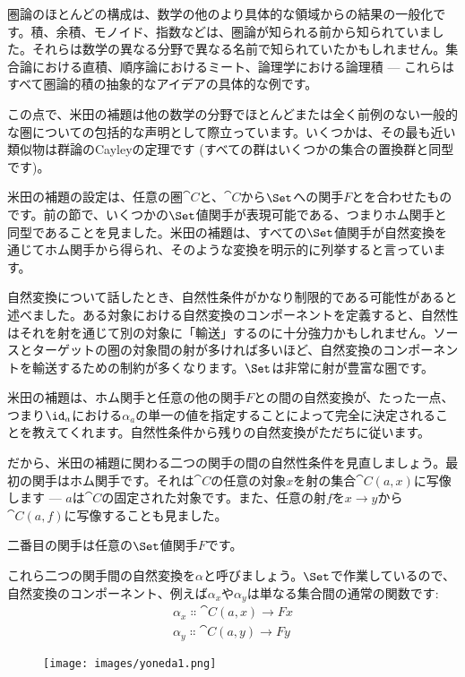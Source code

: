 
\lettrine[lhang=0.17]{圏}{論}のほとんどの構成は、数学の他のより具体的な領域からの結果の一般化です。積、余積、モノイド、指数などは、圏論が知られる前から知られていました。それらは数学の異なる分野で異なる名前で知られていたかもしれません。集合論における直積、順序論におけるミート、論理学における論理積 — これらはすべて圏論的積の抽象的なアイデアの具体的な例です。

この点で、米田の補題は他の数学の分野でほとんどまたは全く前例のない一般的な圏についての包括的な声明として際立っています。いくつかは、その最も近い類似物は群論のCayleyの定理です (すべての群はいくつかの集合の置換群と同型です)。

米田の補題の設定は、任意の圏$\cat{C}$と、$\cat{C}$から$\Set$への関手$F$とを合わせたものです。前の節で、いくつかの$\Set$値関手が表現可能である、つまりホム関手と同型であることを見ました。米田の補題は、すべての$\Set$値関手が自然変換を通じてホム関手から得られ、そのような変換を明示的に列挙すると言っています。

自然変換について話したとき、自然性条件がかなり制限的である可能性があると述べました。ある対象における自然変換のコンポーネントを定義すると、自然性はそれを射を通じて別の対象に「輸送」するのに十分強力かもしれません。ソースとターゲットの圏の対象間の射が多ければ多いほど、自然変換のコンポーネントを輸送するための制約が多くなります。$\Set$は非常に射が豊富な圏です。

米田の補題は、ホム関手と任意の他の関手$F$との間の自然変換が、たった一点、つまり$\id_a$における$\alpha_a$の単一の値を指定することによって完全に決定されることを教えてくれます。自然性条件から残りの自然変換がただちに従います。

だから、米田の補題に関わる二つの関手の間の自然性条件を見直しましょう。最初の関手はホム関手です。それは$\cat{C}$の任意の対象$x$を射の集合$\cat{C}(a, x)$に写像します — $a$は$\cat{C}$の固定された対象です。また、任意の射$f$を$x \to y$から$\cat{C}(a, f)$に写像することも見ました。

二番目の関手は任意の$\Set$値関手$F$です。

これら二つの関手間の自然変換を$\alpha$と呼びましょう。$\Set$で作業しているので、自然変換のコンポーネント、例えば$\alpha_x$や$\alpha_y$は単なる集合間の通常の関数です: 
\begin{gather*}
  \alpha_x \Colon \cat{C}(a, x) \to F x \\
  \alpha_y \Colon \cat{C}(a, y) \to F y
\end{gather*}

\begin{figure}[H]
  \centering
  \texttt{[image: images/yoneda1.png]}
\end{figure}

